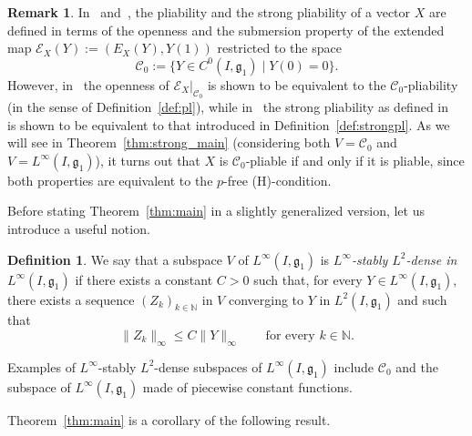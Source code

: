 \documentclass[pdftex]{sigma}
\numberwithin{equation}{section}
\theoremstyle{definition}
\newtheorem{Definition}[Theorem]{Definition}
\newtheorem{Remark}[Theorem]{Remark}
\begin{document}
\begin{Remark}\label{rem:plia-F}In~\cite[Definition 3.4]{Juillet-Sigalotti} and~\cite[Definition~4.1]{SS18}, the pliability
and the strong pliability
of
a vector $X$ are defined in terms of the openness
and the submersion property
of the
extended map $\mathcal{E}_X(Y):=(E_X(Y),Y(1))$ restricted to the space
\[
\mathcal C_0:=\bigl\{Y\in C^0(I,{\mathfrak g}_1)\mid Y(0)=0\bigr\}.
\]
However, in~\cite[Proposition~3.7]{Juillet-Sigalotti}
the openness of $\mathcal{E}_X|_{\mathcal C_0}$ is shown to be equivalent to the $\mathcal C_0$-pliability (in the sense of Definition~\ref{def:pl}), while in~\cite[Lemma~4.2]{SS18}
the strong pliability as defined in~\cite[Definition~4.1]{SS18} is shown to be
equivalent to that introduced in Definition~\ref{def:strongpl}.
As we will see in Theorem~\ref{thm:strong_main} (considering both $V={\mathcal C}_0$ and $V=L^\infty(I,{\mathfrak g}_1)$), it turns out that $X$ is $\mathcal C_0$-pliable if and only if it is pliable, since both properties are equivalent to the $p$-free (H)-condition.
\end{Remark}

Before stating Theorem~\ref{thm:main} in a slightly generalized version, let us introduce a useful notion.

\begin{Definition}\label{def:stabledensity}
We say that a subspace $V$ of $L^\infty(I,{\mathfrak g}_1)$ is
 \emph{$L^\infty$-stably $L^2$-dense in $L^\infty(I,{\mathfrak g}_1)$}
if there exists a constant $C>0$ such that, for every
$Y\in L^\infty(I,{\mathfrak g}_1)$, there exists a sequence
$(Z_k)_{k\in\mathbb{N}}$ in $V$ converging to $Y$ in $L^2(I,{\mathfrak g}_1)$ and such that
\[
\|Z_k\|_\infty
\le C\|Y\|_\infty
\qquad\text{for every }k\in\mathbb{N}.
\]
\end{Definition}
Examples of $L^\infty$-stably $L^2$-dense subspaces of $L^\infty(I,{\mathfrak g}_1)$
include $\mathcal{C}_0$ and the subspace of $L^\infty(I,{\mathfrak g}_1)$ made of piecewise constant functions.

Theorem~\ref{thm:main} is a corollary of the following result.
\end{document}
